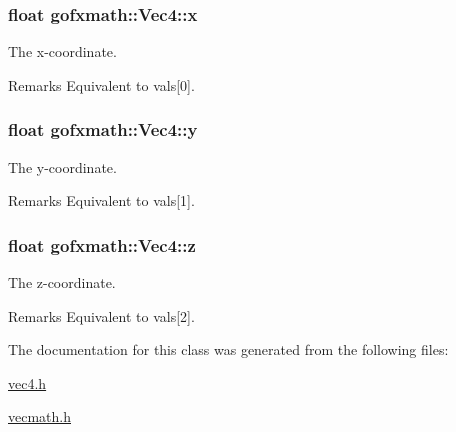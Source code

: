 \subsubsection[{x}]{\setlength{\rightskip}{0pt plus 5cm}float gofxmath\+::\+Vec4\+::x}\label{classgofxmath_1_1_vec4_a5de27b4df2e699a1b30ec3a51258f208}


The x-\/coordinate. 

\begin{DoxyRemark}{Remarks}
Equivalent to vals\mbox{[}0\mbox{]}. 
\end{DoxyRemark}
\hypertarget{classgofxmath_1_1_vec4_a22b749162a1507a1a5d3968b70c6ee4d}{}
\subsubsection[{y}]{\setlength{\rightskip}{0pt plus 5cm}float gofxmath\+::\+Vec4\+::y}\label{classgofxmath_1_1_vec4_a22b749162a1507a1a5d3968b70c6ee4d}


The y-\/coordinate. 

\begin{DoxyRemark}{Remarks}
Equivalent to vals\mbox{[}1\mbox{]}. 
\end{DoxyRemark}
\hypertarget{classgofxmath_1_1_vec4_a36bc9ebeb3901746c975252b329c1d8c}{}
\subsubsection[{z}]{\setlength{\rightskip}{0pt plus 5cm}float gofxmath\+::\+Vec4\+::z}\label{classgofxmath_1_1_vec4_a36bc9ebeb3901746c975252b329c1d8c}


The z-\/coordinate. 

\begin{DoxyRemark}{Remarks}
Equivalent to vals\mbox{[}2\mbox{]}. 
\end{DoxyRemark}


The documentation for this class was generated from the following files\+:\begin{DoxyCompactItemize}
\item 
\hyperlink{vec4_8h}{vec4.\+h}\item 
\hyperlink{vecmath_8h}{vecmath.\+h}\end{DoxyCompactItemize}
